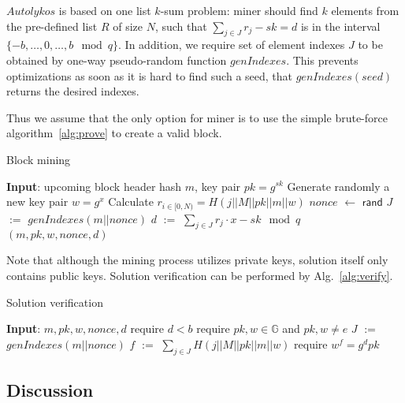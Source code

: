 \documentclass[]{article}
\newcommand{\Name}{$Autolykos$}
\def\Let#1#2{\State #1 $:=$ #2}
\def\LetRnd#1#2{\State #1 $\gets$ #2}
\begin{document}
    \Name{} is based on one list $k$-sum problem: miner should find
    $k$ elements from the pre-defined list $R$ of size $N$, such that
    $\sum_{j \in J} r_{j} - sk = d$ is in the interval $\{-b,\dots,0,\dots,b\mod q\}$.
    In addition, we require set of element indexes $J$ to be obtained
    by one-way pseudo-random function $genIndexes$. This prevents optimizations as
    soon as it is hard to find such a seed,
    that $genIndexes(seed)$ returns the desired indexes.

    Thus we assume that the only option for miner is to use the simple brute-force algorithm~\ref{alg:prove} to
    create a valid block.

    \begin{algorithm}[H]
        \caption{Block mining}
        \label{alg:prove}
        \begin{algorithmic}[1]
            \State \textbf{Input}: upcoming block header hash $m$, key pair $pk=g^{sk}$
            \State Generate randomly a new key pair $w=g^x$
            \State Calculate $r_{i \in [0,N)}=H(j||M||pk||m||w)$
            \LetRnd{$nonce$}{$\mathsf{rand}$}
            \Let{$J$}{$genIndexes(m||nonce)$}
            \Let{$d$}{$\sum_{j \in J}{r_j} \cdot x - sk \mod q$}
            \State \Return $(m,pk,w,nonce,d)$
            \EndIf
            \EndWhile
        \end{algorithmic}
    \end{algorithm}

    Note that although the mining process utilizes private keys, solution itself
    only contains public keys. Solution verification can be performed by Alg.~\ref{alg:verify}.

    \begin{algorithm}[H]
        \caption{Solution verification}
        \label{alg:verify}
        \begin{algorithmic}[1]
            \State \textbf{Input}: $m,pk,w,nonce,d$
            \State require $d < b$
            \State require $pk,w\in \mathbb{G}$ and $pk,w \ne e$
            \Let{$J$}{$genIndexes(m||nonce)$}
            \Let{$f$}{$\sum_{j \in J} H(j||M||pk||m||w)$}
            \State require $w^f = g^dpk$
        \end{algorithmic}
    \end{algorithm}


    \subsection{Discussion}
    \label{discussion}
\end{document}

